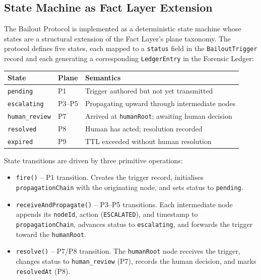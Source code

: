 \subsection{State Machine as Fact Layer Extension}
\label{sec:state-machine-extension}

The Bailout Protocol is implemented as a deterministic state machine whose states are a structural extension of the Fact Layer's plane taxonomy. The protocol defines five states, each mapped to a \texttt{status} field in the \texttt{BailoutTrigger} record and each generating a corresponding \texttt{LedgerEntry} in the Forensic Ledger:

\bigskip
\noindent
\begin{tabular}{llp{7.5cm}}
  \hline
  \textbf{State} & \textbf{Plane} & \textbf{Semantics} \\
  \hline
  \texttt{pending}         & P1 & Trigger authored but not yet transmitted \\
  \texttt{escalating}      & P3--P5 & Propagating upward through intermediate nodes \\
  \texttt{human\_review}   & P7 & Arrived at \texttt{humanRoot}; awaiting human decision \\
  \texttt{resolved}        & P8 & Human has acted; resolution recorded \\
  \texttt{expired}         & P9 & TTL exceeded without human resolution \\
  \hline
\end{tabular}
\bigskip

State transitions are driven by three primitive operations:

\begin{itemize}
  \item \texttt{fire()} -- P1 transition. Creates the trigger record, initialises
        \texttt{propagationChain} with the originating node, and sets status to \texttt{pending}.
  \item \texttt{receiveAndPropagate()} -- P3--P5 transitions. Each intermediate node
        appends its \texttt{nodeId}, action (\texttt{ESCALATED}), and timestamp to
        \texttt{propagationChain}, advances status to \texttt{escalating}, and
        forwards the trigger toward the \texttt{humanRoot}.
  \item \texttt{resolve()} -- P7/P8 transition. The \texttt{humanRoot} node receives
        the trigger, changes status to \texttt{human\_review} (P7), records the human
        decision, and marks \texttt{resolvedAt} (P8).
\end{itemize}

